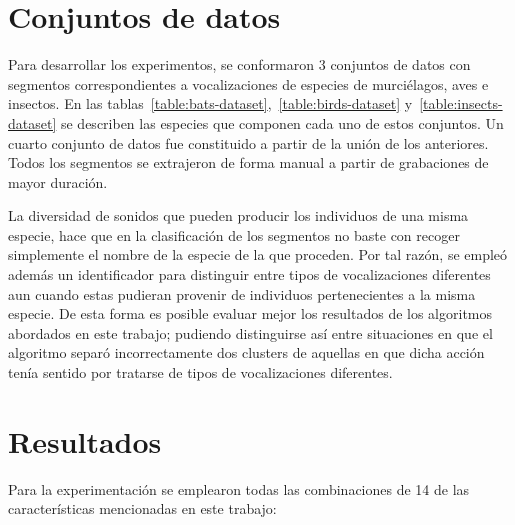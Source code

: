 \section{Conjuntos de datos}\label{sec:datasets}

Para desarrollar los experimentos, se conformaron 3 conjuntos de datos con segmentos correspondientes a vocalizaciones de especies de murciélagos, aves e insectos.
En las tablas~\ref{table:bats-dataset},~\ref{table:birds-dataset} y~\ref{table:insects-dataset} se describen las especies que componen cada uno de estos conjuntos.
Un cuarto conjunto de datos fue constituido a partir de la unión de los anteriores.
Todos los segmentos se extrajeron de forma manual a partir de grabaciones de mayor duración.

La diversidad de sonidos que pueden producir los individuos de una misma especie, hace que en la clasificación de los segmentos no baste con recoger simplemente el nombre de la especie de la que proceden.
Por tal razón, se empleó además un identificador para distinguir entre tipos de vocalizaciones diferentes aun cuando estas pudieran provenir de individuos pertenecientes a la misma especie.
De esta forma es posible evaluar mejor los resultados de los algoritmos abordados en este trabajo;
pudiendo distinguirse así entre situaciones en que el algoritmo separó incorrectamente dos clusters de aquellas en que dicha acción tenía sentido por tratarse de tipos de vocalizaciones diferentes.

\section{Resultados}\label{sec:results}

Para la experimentación se emplearon todas las combinaciones de 14 de las características mencionadas en este trabajo:

